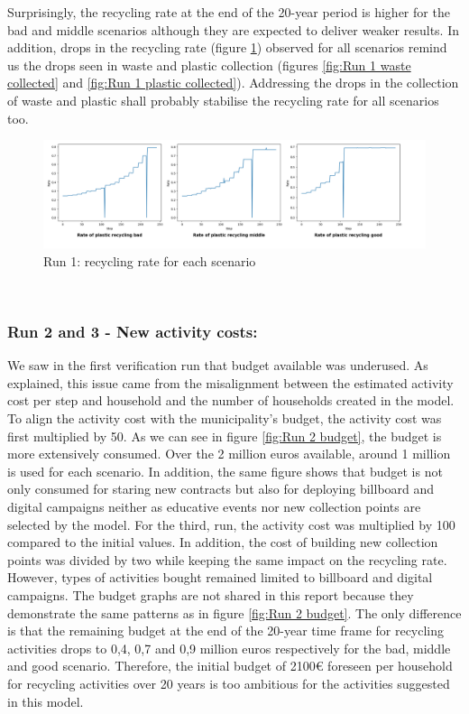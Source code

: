\noindent Surprisingly, the recycling rate at the end of the 20-year period is higher for the bad and middle scenarios although they are expected to deliver weaker results. In addition, drops in the recycling rate (figure \ref{fig:Run 1 recycling rate}) observed for all scenarios remind us the drops seen in waste and plastic collection (figures \ref{fig:Run 1 waste collected} and \ref{fig:Run 1 plastic collected}). Addressing the drops in the collection of waste and plastic shall probably stabilise the recycling rate for all scenarios too. 

\begin{figure}[H]
    \centering
        \captionsetup{width=\linewidth}
        \includegraphics[width=1.0\linewidth]{Images/Run 1 recycling rate.png}
        \caption{Run 1: recycling rate for each scenario}
    \label{fig:Run 1 recycling rate}
\end{figure}\\

\subsubsection{Run 2 and 3 - New activity costs:}
We saw in the first verification run that budget available was underused. As explained, this issue came from the misalignment between the estimated activity cost per step and household and the number of households created in the model. To align the activity cost with the municipality's budget, the activity cost was first multiplied by 50. As we can see in figure \ref{fig:Run 2 budget}, the budget is more extensively consumed. Over the 2 million euros available, around 1 million is used for each scenario. In addition, the same figure shows that budget is not only consumed for staring new contracts but also for deploying billboard and digital campaigns neither as educative events nor new collection points are selected by the model. For the third, run, the activity cost was multiplied by 100 compared to the initial values. In addition, the cost of building new collection points was divided by two while keeping the same impact on the recycling rate. However, types of activities bought remained limited to billboard and digital campaigns. The budget graphs are not shared in this report because they demonstrate the same patterns as in figure \ref{fig:Run 2 budget}. The only difference is that the remaining budget at the end of the 20-year time frame for recycling activities drops to 0,4, 0,7 and 0,9 million euros respectively for the bad, middle and good scenario. Therefore, the initial budget of 2100€ foreseen per household for recycling activities over 20 years is too ambitious for the activities suggested in this model.\\

